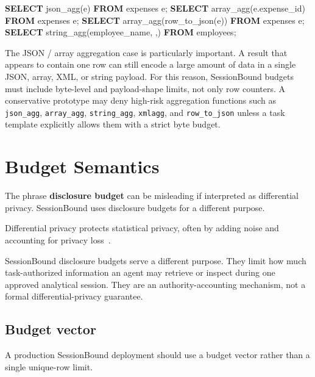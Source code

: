 \documentclass[
]{article}
\newenvironment{Shaded}{}{}
\newcommand{\KeywordTok}[1]{\textcolor[rgb]{0.00,0.44,0.13}{\textbf{#1}}}
\newcommand{\NormalTok}[1]{#1}
\newcommand{\StringTok}[1]{\textcolor[rgb]{0.25,0.44,0.63}{#1}}
\newcounter{algorithm}
\begin{document}
\begin{Shaded}
\begin{Highlighting}[]
\KeywordTok{SELECT}\NormalTok{ json\_agg(e) }\KeywordTok{FROM}\NormalTok{ expenses e;}
\KeywordTok{SELECT}\NormalTok{ array\_agg(e.expense\_id) }\KeywordTok{FROM}\NormalTok{ expenses e;}
\KeywordTok{SELECT}\NormalTok{ array\_agg(row\_to\_json(e)) }\KeywordTok{FROM}\NormalTok{ expenses e;}
\KeywordTok{SELECT}\NormalTok{ string\_agg(employee\_name, }\StringTok{\textquotesingle{},\textquotesingle{}}\NormalTok{) }\KeywordTok{FROM}\NormalTok{ employees;}
\end{Highlighting}
\end{Shaded}

The JSON / array aggregation case is particularly important. A result
that appears to contain one row can still encode a large amount of data
in a single JSON, array, XML, or string payload. For this reason,
SessionBound budgets must include byte-level and payload-shape limits,
not only row counters. A conservative prototype may deny high-risk
aggregation functions such as \texttt{json\_agg}, \texttt{array\_agg},
\texttt{string\_agg}, \texttt{xmlagg}, and \texttt{row\_to\_json} unless
a task template explicitly allows them with a strict byte budget.


\hypertarget{budget-semantics}{%
\section{Budget Semantics}\label{budget-semantics}}

The phrase \textbf{disclosure budget} can be misleading if interpreted
as differential privacy. SessionBound uses disclosure budgets for a
different purpose.

Differential privacy protects statistical privacy, often by adding noise
and accounting for privacy loss~\cite{dwork2014algorithmic}.

SessionBound disclosure budgets serve a different purpose. They limit
how much task-authorized information an agent may retrieve or inspect
during one approved analytical session. They are an authority-accounting
mechanism, not a formal differential-privacy guarantee.

\hypertarget{budget-vector}{%
\subsection{Budget vector}\label{budget-vector}}

A production SessionBound deployment should use a budget vector rather
than a single unique-row limit.
\end{document}
